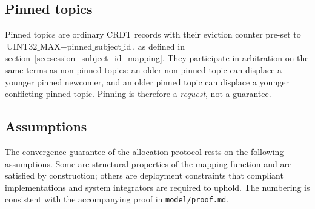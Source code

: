 \subsection{Pinned topics}

Pinned topics are ordinary CRDT records with their eviction counter pre-set to
$\text{UINT32\_MAX} - \text{pinned\_subject\_id}$, as defined in
section~\ref{sec:session_subject_id_mapping}.
They participate in arbitration on the same terms as non-pinned topics: an older
non-pinned topic can displace a younger pinned newcomer, and an older pinned topic
can displace a younger conflicting pinned topic.
Pinning is therefore a \emph{request}, not a guarantee.

\subsection{Assumptions}

The convergence guarantee of the allocation protocol rests on the following
assumptions. Some are structural properties of the mapping function and are
satisfied by construction; others are deployment constraints that compliant
implementations and system integrators are required to uphold. The numbering is
consistent with the accompanying proof in \texttt{model/proof.md}.

